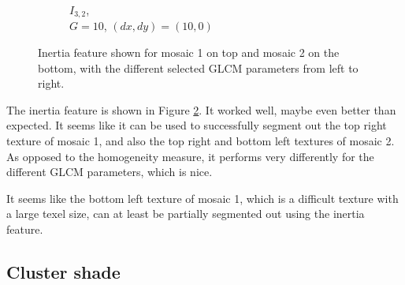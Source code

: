 \documentclass[a4paper]{article}
\begin{document}
\begin{figure}
\begin{subfigure}[b]{0.30\textwidth}
        \caption{%
            $I_{3,2}$, \\
            $G=10$, $(dx, dy)=(10,0)$
        }
        \label{fig:i32}
    \end{subfigure}

    \caption{%
        Inertia feature shown for mosaic 1 on top and mosaic 2 on
        the bottom, with the different selected GLCM parameters from
        left to right.
    }
    \label{fig:inertia}
\end{figure}

The inertia feature is shown in Figure \ref{fig:inertia}. It worked
well, maybe even better than expected. It seems like it can be used to
successfully segment out the top right texture of mosaic 1, and also the
top right and bottom left textures of mosaic 2. As opposed to the
homogeneity measure, it performs very differently for the different GLCM
parameters, which is nice.

It seems like the bottom left texture of mosaic 1, which is a difficult
texture with a large texel size, can at least be partially segmented out
using the inertia feature.

\subsection{Cluster shade}
\end{document}
